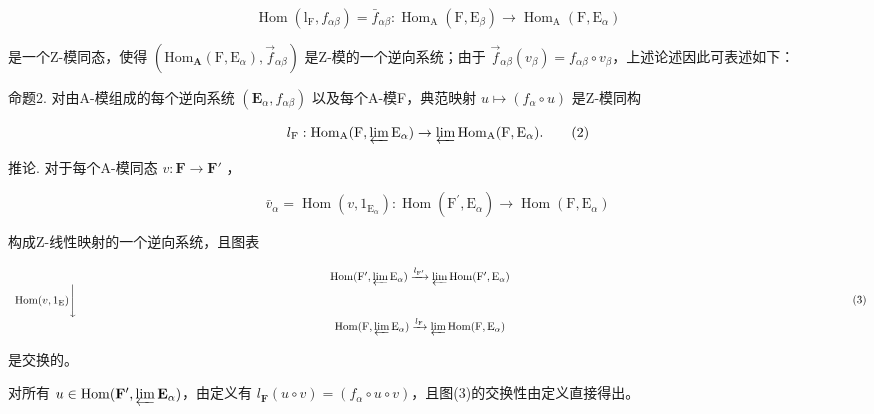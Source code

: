 \[
\operatorname{Hom} \left(\mathrm{l} _ {\mathrm{F}}, f _ {\alpha \beta}\right) = \bar {f} _ {\alpha \beta}: \operatorname{Hom} _ {\mathrm{A}} (\mathrm{F}, \mathrm{E} _ {\beta}) \rightarrow \operatorname{Hom} _ {\mathrm{A}} (\mathrm{F}, \mathrm{E} _ {\alpha})
\]

是一个Z-模同态，使得 \((\mathrm{Hom}_{\mathbf{A}}(\mathrm{F}, \mathrm{E}_{\alpha}), \vec{f}_{\alpha\beta})\) 是Z-模的一个逆向系统；由于 \(\vec{f}_{\alpha\beta}(v_{\beta}) = f_{\alpha\beta} \circ v_{\beta}\)，上述论述因此可表述如下：

命题2. 对由A-模组成的每个逆向系统 \((\mathbf{E}_{\alpha}, f_{\alpha \beta})\) 以及每个A-模F，典范映射 \(u \mapsto (f_{\alpha} \circ u)\) 是Z-模同构

\[
l _ {\mathrm{F}}: \operatorname{Hom} _ {\mathrm{A}} (\mathrm{F}, \varprojlim \mathrm{E} _ {\alpha}) \rightarrow \varprojlim \operatorname{Hom} _ {\mathrm{A}} (\mathrm{F}, \mathrm{E} _ {\alpha}).\tag{2}
\]

推论. 对于每个A-模同态 \(v: \mathbf{F} \to \mathbf{F}'\) ，

\[
\bar {v} _ {\alpha} = \operatorname{Hom} (v, 1 _ {\mathrm{E} _ {\alpha}}): \operatorname{Hom} (\mathrm{F} ^ {\prime}, \mathrm{E} _ {\alpha}) \rightarrow \operatorname{Hom} (\mathrm{F}, \mathrm{E} _ {\alpha})
\]

构成Z-线性映射的一个逆向系统，且图表

\[
\begin{array}{c} \operatorname{Hom} (\mathrm{F} ^ {\prime}, \varprojlim \mathrm{E} _ {\alpha}) \xrightarrow {l _ {\mathrm{F} ^ {\prime}}} \varprojlim \operatorname{Hom} (\mathrm{F} ^ {\prime}, \mathrm{E} _ {\alpha}) \\ \operatorname{Hom} (v, 1 _ {\mathrm{E}}) \Biggl \downarrow \qquad \qquad \qquad \qquad \qquad \qquad \qquad \qquad \qquad \qquad \qquad \qquad \qquad \qquad \qquad \qquad \qquad \qquad \qquad \qquad \qquad \qquad \qquad \qquad \qquad \qquad \qquad \qquad \qquad \qquad \qquad \qquad \qquad \qquad \\ \operatorname{Hom} (\mathrm{F}, \varprojlim \mathrm{E} _ {\alpha}) \xrightarrow {l _ {\mathrm{F}}} \varprojlim \operatorname{Hom} (\mathrm{F}, \mathrm{E} _ {\alpha}) \end{array}\tag{3}
\]

是交换的。

对所有 \(u \in \operatorname{Hom}(\mathbf{F}', \varprojlim \mathbf{E}_{\alpha})\)，由定义有 \(l_{\mathbf{F}}(u \circ v) = (f_{\alpha} \circ u \circ v)\)，且图(3)的交换性由定义直接得出。

